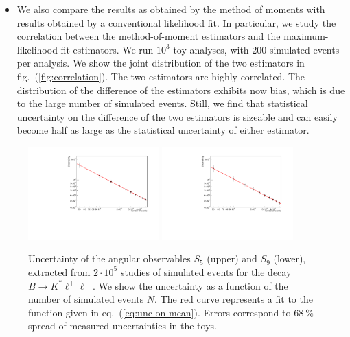 \documentclass[aps,nofootinbib,preprintnumbers,prd,twocolumn]{revtex4-1}
\newcommand{\refeq}[1]{eq.~(\ref{eq:#1})}
\newcommand{\reffig}[1]{fig.~(\ref{fig:#1})}
\begin{document}
\begin{itemize}
    \item We also compare the results as obtained by the method of moments with
        results obtained by a conventional likelihood fit. In particular, we
        study the correlation between the method-of-moment estimators and the
        maximum-likelihood-fit estimators. We run $10^3$ toy analyses, with
        $200$ simulated events per analysis. We show the joint distribution of
        the two estimators in \reffig{correlation}. The two estimators are
        highly correlated. The distribution of the difference of the estimators
        exhibits now bias, which is due to the large number of simulated
        events.  Still, we find that statistical uncertainty on the difference
        of the two estimators is sizeable and can easily become half as large
        as the statistical uncertainty of either estimator.
\end{itemize}
\begin{figure}[t]
        \centering
            \includegraphics[width=0.45\textwidth]{figs/Q2_1_2_S5.pdf}
            \includegraphics[width=0.45\textwidth]{figs/Q2_1_2_S9.pdf}
        \caption{Uncertainty of the angular observables $S_5$ (upper) and $S_9$
            (lower), extracted from $2\cdot 10^5$ studies of simulated events
            for the decay $B\to K^*\ell^+\ell^-$. We show the uncertainty as a
            function of the number of simulated events $N$.  The red curve
        represents a fit to the function given in \refeq{unc-on-mean}. Errors correspond to $68~\%$ spread of measured uncertainties in the toys.}
        \label{fig:errors}
\end{figure}
\end{document}
